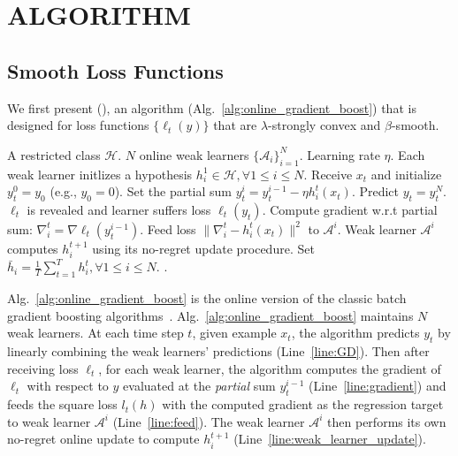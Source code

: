 \section{ALGORITHM}
\subsection{Smooth Loss Functions}
We first present \algname (\algshort), an algorithm (Alg.~\ref{alg:online_gradient_boost}) that is designed for loss functions $\{\ell_t(y)\}$ that are $\lambda$-strongly convex and $\beta$-smooth. 
\begin{algorithm}[tb]
\caption{\algname (\algshort)}
 \label{alg:online_gradient_boost}
\begin{algorithmic}[1]
   A restricted  class $\mathcal{H}$. $N$ online weak learners $\{\mathcal{A}_i\}_{i=1}^N$. Learning rate $\eta$.
  \STATE Each weak learner initlizes a hypothesis $h_i^1\in\mathcal{H},\forall 1\leq i\leq N$.
    \STATE Receive  $x_t$ and initialize $y_t^{0} = y_0$ (e.g., $y_0 = 0$). 
    \label{line:GD}
        \STATE Set the partial sum $y_t^{i} = y_t^{i-1} - \eta h_i^{t}(x_t)$.
    \ENDFOR
    \STATE Predict $y_t = y_t^N$.
    \STATE $\ell_t$ is revealed and learner suffers loss $\ell_t(y_t)$.
        \STATE Compute gradient w.r.t partial sum: $\nabla_i^t = \nabla\ell_t(y_t^{i-1})$.
        \label{line:gradient}
        \STATE Feed loss $\|\nabla_i^t - h_i^t(x_t)\|^2$ to $\mathcal{A}^i$.
        \label{line:feed}
        \STATE Weak learner $\mathcal{A}^i$ computes $h_i^{t+1}$ using its no-regret update procedure.
        \label{line:weak_learner_update}
    \ENDFOR
 \ENDFOR
 \STATE Set $\bar{h}_i =\frac{1}{T} \sum_{t=1}^Th_{i}^t,\forall 1\leq i\leq N$. \label{line:average}
 . \label{line:stoch_return} 
\end{algorithmic}
\end{algorithm}
Alg.~\ref{alg:online_gradient_boost} is the online version of the classic batch gradient boosting algorithms~\citep{friedman2001greedy,grubb2011generalized}. Alg.~\ref{alg:online_gradient_boost} maintains $N$ weak learners. At each time step $t$, given example $x_t$, the algorithm predicts $y_t$ by linearly combining the weak learners' predictions (Line~\ref{line:GD}). Then after receiving loss $\ell_t$, for each weak learner, the algorithm computes the gradient of $\ell_t$ with respect to $y$ evaluated at the \emph{partial} sum $y_t^{i-1}$ (Line~\ref{line:gradient}) and feeds the square loss  $l_t(h)$ with the computed gradient as the regression target to weak learner $\mathcal{A}^i$ (Line~\ref{line:feed}). The weak learner $\mathcal{A}^i$ then performs its own no-regret online update to compute $h_{i}^{t+1}$ (Line~\ref{line:weak_learner_update}).


